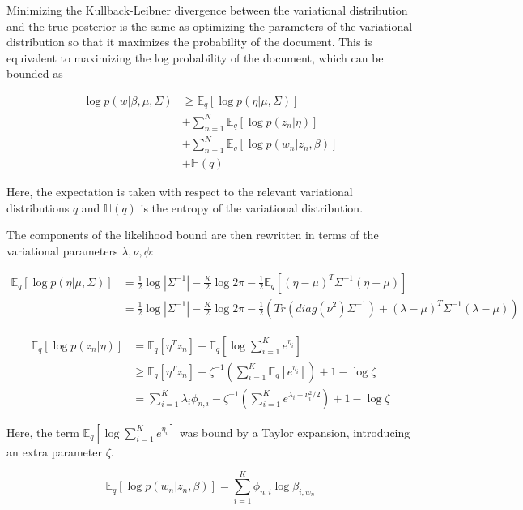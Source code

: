 \documentclass[12pt,a4paper,twoside,openright]{report}
\begin{document}
Minimizing the Kullback-Leibner divergence between the variational distribution and the true posterior is the same as optimizing the parameters of the variational distribution so that it maximizes the probability of the document. This is equivalent to maximizing the log probability of the document, which can be bounded as

\begin{align}\label{eq:likelihood-bound}
\log p(w | \beta, \mu, \Sigma) & \geq \mathbb{E}_q[\log p(\eta|\mu, \Sigma)] \\
& + \sum\limits_{n=1}^N \mathbb{E}_q[\log p(z_n | \eta)] \\
& + \sum\limits_{n=1}^N \mathbb{E}_q[\log p(w_n | z_n, \beta)] \\
& + \mathbb{H}(q)
\end{align}

Here, the expectation is taken with respect to the relevant variational distributions $q$ and $\mathbb{H}(q)$ is the entropy of the variational distribution.

The components of the likelihood bound are then rewritten in terms of the variational parameters $\lambda, \nu, \phi$:

\begin{align}
\mathbb{E}_q[\log p(\eta|\mu, \Sigma)] & = \frac{1}{2} \log |\Sigma^{-1}| - \frac{K}{2} \log 2 \pi - \frac{1}{2}\mathbb{E}_q[(\eta - \mu)^T\Sigma^{-1}(\eta - \mu)] \\ \label{eq:eta_mu_sigma}
& = \frac{1}{2} \log |\Sigma^{-1}| - \frac{K}{2} \log 2 \pi - \frac{1}{2}(\mathit{Tr}(\mathit{diag}(\nu^2)\Sigma^{-1}) + (\lambda - \mu)^T\Sigma^{-1}(\lambda - \mu))
\end{align}

\begin{align}
\mathbb{E}_q[\log p(z_n | \eta)] & = \mathbb{E}_q[\eta^Tz_n] - \mathbb{E}_q[\log \sum\limits_{i=1}^K e^{\eta_i}] \\
& \geq \mathbb{E}_q[\eta^Tz_n] - \zeta^{-1}\left(\sum\limits_{i=1}^K\mathbb{E}_q[e^{\eta_i}]\right) + 1 - \log\zeta \\
& = \sum\limits_{i=1}^K\lambda_i\phi_{n, i} - \zeta^{-1}\left(\sum\limits_{i=1}^Ke^{\lambda_i + \nu_i^2 / 2}\right) + 1 - \log\zeta
\end{align}

Here, the term $\mathbb{E}_q[\log \sum\limits_{i=1}^K e^{\eta_i}]$ was bound by a Taylor expansion, introducing an extra parameter $\zeta$.

\begin{equation}
\mathbb{E}_q[\log p(w_n | z_n, \beta)] = \sum\limits_{i=1}^K\phi_{n,i}\log\beta_{i, w_n}
\end{equation}
\end{document}
